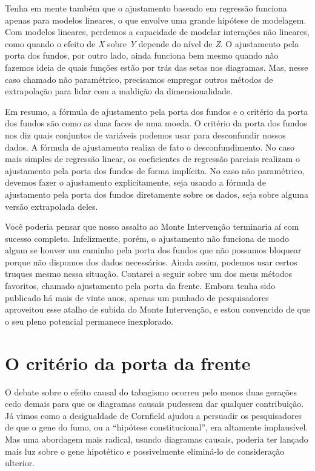 \documentclass[11pt,a5paper,twoside]{book}
\begin{document}
Tenha em mente também que o ajustamento baseado em regressão funciona apenas para modelos lineares, o que envolve uma grande hipótese de modelagem. Com modelos lineares, perdemos a capacidade de modelar interações não lineares, como quando o efeito de \textit{X} sobre \textit{Y} depende do nível de \textit{Z}. O ajustamento pela porta dos fundos, por outro lado, ainda funciona bem mesmo quando não fazemos ideia de quais funções estão por trás das setas nos diagramas. Mas, nesse caso chamado não paramétrico, precisamos empregar outros métodos de extrapolação para lidar com a maldição da dimensionalidade.

Em resumo, a fórmula de ajustamento pela porta dos fundos e o critério da porta dos fundos são como as duas faces de uma moeda. O critério da porta dos fundos nos diz quais conjuntos de variáveis podemos usar para desconfundir nossos dados. A fórmula de ajustamento realiza de fato o desconfundimento. No caso mais simples de regressão linear, os coeficientes de regressão parciais realizam o ajustamento pela porta dos fundos de forma implícita. No caso não paramétrico, devemos fazer o ajustamento explicitamente, seja usando a fórmula de ajustamento pela porta dos fundos diretamente sobre os dados, seja sobre alguma versão extrapolada deles.

Você poderia pensar que nosso assalto ao Monte Intervenção terminaria aí com sucesso completo. Infelizmente, porém, o ajustamento não funciona de modo algum se houver um caminho pela porta dos fundos que não possamos bloquear porque não dispomos dos dados necessários. Ainda assim, podemos usar certos truques mesmo nessa situação. Contarei a seguir sobre um dos meus métodos favoritos, chamado ajustamento pela porta da frente. Embora tenha sido publicado há mais de vinte anos, apenas um punhado de pesquisadores aproveitou esse atalho de subida do Monte Intervenção, e estou convencido de que o seu pleno potencial permanece inexplorado.

\section{O critério da porta da frente}
O debate sobre o efeito causal do tabagismo ocorreu pelo menos duas gerações cedo demais para que os diagramas causais pudessem dar qualquer contribuição. Já vimos como a desigualdade de Cornfield ajudou a persuadir os pesquisadores de que o gene do fumo, ou a “hipótese constitucional”, era altamente implausível. Mas uma abordagem mais radical, usando diagramas causais, poderia ter lançado mais luz sobre o gene hipotético e possivelmente eliminá-lo de consideração ulterior.
\end{document}

